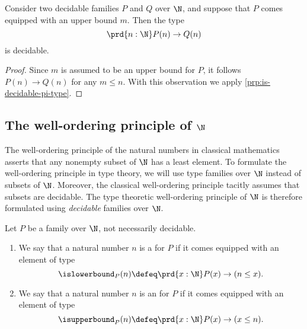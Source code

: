 \begin{cor}\label{cor:is-decidable-bounded-pi}
  Consider two decidable families $P$ and $Q$ over $\N$, and suppose that $P$ comes equipped with an upper bound $m$. Then the type
  \begin{equation*}
    \prd{n:\N}P(n)\to Q(n)
  \end{equation*}
  is decidable.
\end{cor}

\begin{proof}
  Since $m$ is assumed to be an upper bound for $P$, it follows $P(n)\to Q(n)$ for any $m\leq n$. With this observation we apply \cref{prp:is-decidable-pi-type}.
\end{proof}

\subsection{The well-ordering principle of \texorpdfstring{$\N$}{ℕ}}

The well-ordering principle of the natural numbers in classical mathematics asserts that any nonempty subset of $\N$ has a least element. To formulate the well-ordering principle in type theory, we will use type families over $\N$ instead of subsets of $\N$. Moreover, the classical well-ordering principle tacitly assumes that subsets are decidable. The type theoretic well-ordering principle of $\N$ is therefore formulated using \emph{decidable} families over $\N$.

\begin{defn}
  Let $P$ be a family over $\N$, not necessarily decidable.
  \begin{enumerate}
  \item We say that a natural number $n$ is a  for $P$ if it comes equipped with an element of type
    \begin{equation*}
      \islowerbound_P(n)\defeq \prd{x:\N}P(x)\to (n\leq x).
    \end{equation*}
  \item We say that a natural number $n$ is an  for $P$ if it comes equipped with an element of type
    \begin{equation*}
      \isupperbound_P(n)\defeq \prd{x:\N}P(x)\to (x\leq n).
    \end{equation*}
  \end{enumerate}
\end{defn}


